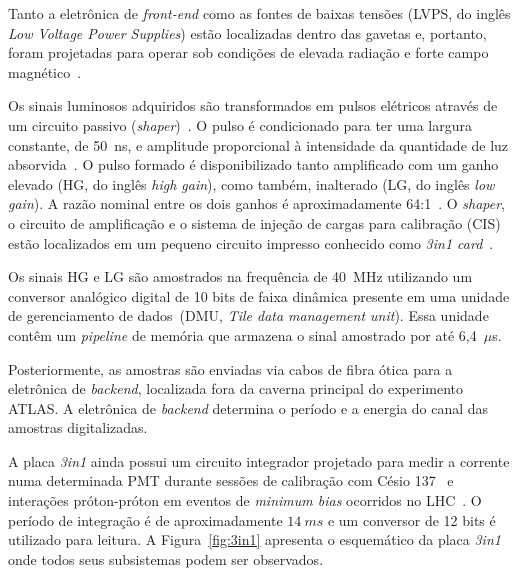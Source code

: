 Tanto a eletrônica de \emph{front-end} como as fontes de baixas tensões (LVPS, do
inglês \emph{Low Voltage Power Supplies}) estão localizadas dentro das gavetas e,
portanto, foram projetadas para operar sob condições de elevada radiação e forte
campo magnético~\cite{hruska2007radiation,ARABIDZE2011}.

Os sinais luminosos adquiridos são transformados em  pulsos elétricos
através de um circuito passivo (\emph{shaper})~\cite{AMES1998}. O pulso é
condicionado para ter uma largura constante, de 50~ns, e amplitude proporcional
à intensidade da quantidade de luz absorvida~\cite{ANDERSON2005}. O pulso
formado é disponibilizado tanto amplificado com um  ganho elevado (HG, do
inglês \emph{high gain}), como também, inalterado (LG, do inglês \emph{low
gain}). A razão nominal entre os dois ganhos é aproximadamente
64:1~\cite{AAD2010READINESS}. O \emph{shaper}, o circuito de amplificação e o
sistema de injeção de cargas para calibração (CIS) estão localizados em um
pequeno circuito impresso conhecido como \emph{3in1 card}~\cite{ANDERSON2005}.

Os sinais HG e LG são amostrados na frequência de 40~MHz utilizando um conversor
analógico digital de 10 bits de faixa dinâmica presente em uma unidade de
gerenciamento de dados~(DMU, \emph{Tile data management unit}). Essa unidade
contêm um \emph{pipeline} de memória que armazena o sinal amostrado por até
6,4~$\mu$s. 

Posteriormente, as amostras são enviadas via cabos de fibra ótica para a
eletrônica de \emph{backend}, localizada fora da caverna principal do
experimento ATLAS. A eletrônica de \emph{backend} determina o período e a
energia do canal das amostras digitalizadas.

A placa \emph{3in1} ainda possui um circuito integrador projetado para medir a
corrente numa determinada PMT durante sessões de calibração com Césio
137~\cite{ANDERSON2009} e interações próton-próton em eventos de \emph{minimum
bias} ocorridos no LHC~\cite{AAD2010READINESS}. O período de integração é de
aproximadamente $14~ms$ e um conversor de 12 bits é utilizado para leitura. A
Figura~\ref{fig:3in1} apresenta o esquemático da placa \emph{3in1} onde todos
seus subsistemas podem ser observados.

